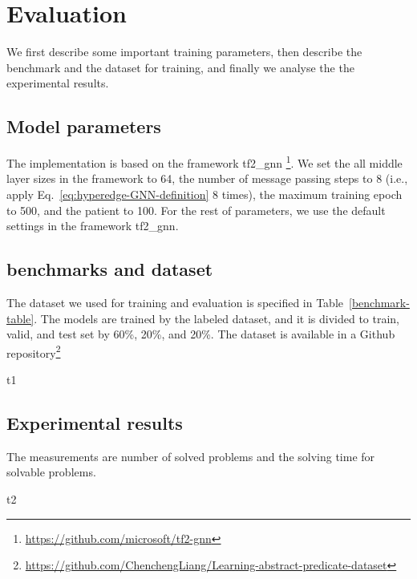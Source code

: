 
% 


\section{Evaluation} \label{section:evaluation}
We first describe some important training parameters, then describe the benchmark and the dataset for training, and finally we analyse the the experimental results. 


\subsection{Model parameters}
The implementation is based on the framework tf2\_gnn \footnote{\url{https://github.com/microsoft/tf2-gnn}}. We set the all middle layer sizes in the framework to 64, the number of message passing steps to 8 (i.e., apply Eq.~\ref{eq:hyperedge-GNN-definition} 8 times), the maximum training epoch to 500, and the patient to 100. For the rest of parameters, we use the default settings in the framework tf2\_gnn. 


\subsection{benchmarks and dataset}
The dataset we used for training and evaluation is specified in Table~\ref{benchmark-table}. The models are trained by the labeled dataset, and it is divided to train, valid, and test set by 60\%, 20\%, and 20\%. The dataset is available in a Github repository\footnote{\url{https://github.com/ChenchengLiang/Learning-abstract-predicate-dataset}}

{t1}



\subsection{Experimental results}
The measurements are number of solved problems and the solving time for solvable problems.

{t2}


